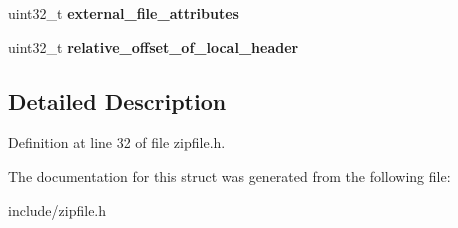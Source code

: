 \begin{DoxyCompactItemize}
\item 
\hypertarget{structpkzip__central__directory__header__main_af8525627c07fb36b9c151c50d23a1844}{uint32\-\_\-t {\bfseries external\-\_\-file\-\_\-attributes}}\label{structpkzip__central__directory__header__main_af8525627c07fb36b9c151c50d23a1844}

\item 
\hypertarget{structpkzip__central__directory__header__main_a204a5c86f6c94890c8ad0b6b73f967b6}{uint32\-\_\-t {\bfseries relative\-\_\-offset\-\_\-of\-\_\-local\-\_\-header}}\label{structpkzip__central__directory__header__main_a204a5c86f6c94890c8ad0b6b73f967b6}

\end{DoxyCompactItemize}


\subsection{Detailed Description}


Definition at line 32 of file zipfile.\-h.



The documentation for this struct was generated from the following file\-:\begin{DoxyCompactItemize}
\item 
include/zipfile.\-h\end{DoxyCompactItemize}
